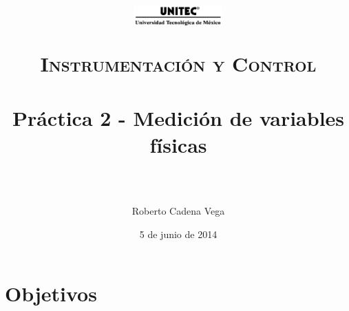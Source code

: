 



\title{
	\normalfont \normalsize
	\begin{figure}[h]
		\begin{center}
			\includegraphics[width=0.3\textwidth]{../images/UNITEC.png} %
		\end{center}
	\end{figure}
	\textsc{Instrumentación y Control} \\ [25pt]
	\horrule{0.5pt} \\[0.4cm] %
	\huge Práctica 2 - Medición de variables físicas \\ %
	\horrule{2pt} \\[0.5cm] %
}

\author{Roberto Cadena Vega} %

\date{\normalsize 5 de junio de 2014} %




\maketitle %


\section{Objetivos}

